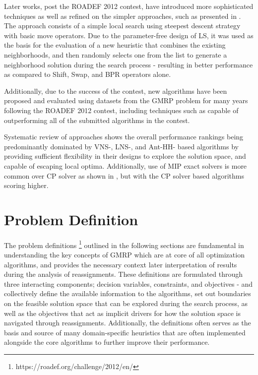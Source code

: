 \documentclass[a4paper,12pt]{Classes/RoboticsLaTeX}
\begin{document}
Later works, post the ROADEF 2012 contest, have introduced more sophisticated techniques as well as refined on the simpler approaches, such as presented in \cite{turky2017}. The approach consists of a simple local search using steepest descent strategy with basic move operators. Due to the parameter-free design of LS, it was used as the basis for the evaluation of a new heuristic that combines the existing neighborhoods, and then randomly selects one from the list to generate a neighborhood solution during the search process - resulting in better performance as compared to Shift, Swap, and BPR operators alone.

Additionally, due to the success of the contest, new algorithms have been proposed and evaluated using datasets from the GMRP problem for many years following the ROADEF 2012 contest, including techniques such as capable of outperforming all of the submitted algorithms in the contest. \cite{turky2018}

Systematic review of approaches \cite{canales2020} shows the overall performance rankings being predominantly dominated by VNS-, LNS-, and Ant-HH- based algorithms by providing sufficient flexibility in their designs to explore the solution space, and capable of escaping local optima. 
Additionally, use of MIP exact solvers is more common over CP solver as shown in \cite{murat2016}, but with the CP solver based algorithms scoring higher.


\chapter{Problem Definition}

The problem definitions \footnote[2]{https://roadef.org/challenge/2012/en/} outlined in the following sections are fundamental in understanding the key concepts of GMRP which are at core of all optimization algorithms, and provides the necessary context later interpretation of results during the analysis of reassignments.
These definitions are formulated through three interacting components; decision variables, constraints, and objectives - and collectively define the available information to the algorithms, set out boundaries on the feasible solution space that can be explored during the search process, as well as the objectives that act as implicit drivers for how the solution space is navigated through reassignments.
Additionally, the definitions often serves as the basis and source of many domain-specific heuristics that are often implemented alongside the core algorithms to further improve their performance.
\end{document}
